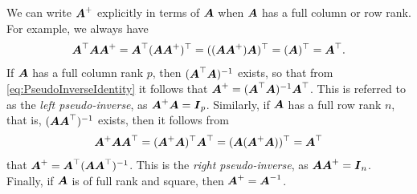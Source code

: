 We can write \(\boldsymbol{A}^+\) explicitly in terms of \(\boldsymbol{A}\) when \(\boldsymbol{A}\) has a full column or row rank. For example, we always have
\begin{equation}
	\boldsymbol{A}^\top \boldsymbol{A} \boldsymbol{A}^+ = \boldsymbol{A}^\top (\boldsymbol{A} \boldsymbol{A}^+)^\top = ((\boldsymbol{A} \boldsymbol{A}^+) \boldsymbol{A})^\top = (\boldsymbol{A})^\top = \boldsymbol{A}^\top. \label{eq:PseudoInverseIdentity}
\end{equation}
If \(\boldsymbol{A}\) has a full column rank \(p\), then \((\boldsymbol{A}^\top \boldsymbol{A})^{-1}\) exists, so that from \eqref{eq:PseudoInverseIdentity} it follows that \(\boldsymbol{A}^+ = (\boldsymbol{A}^\top \boldsymbol{A})^{-1} \boldsymbol{A}^\top\). This is referred to as the \textit{left pseudo-inverse}, as \(\boldsymbol{A}^+ \boldsymbol{A} = \boldsymbol{I}_p\). Similarly, if \(\boldsymbol{A}\) has a full row rank \(n\), that is, \((\boldsymbol{A} \boldsymbol{A}^\top)^{-1}\) exists, then it follows from
\begin{equation*}
	\boldsymbol{A}^+ \boldsymbol{A} \boldsymbol{A}^\top = (\boldsymbol{A}^+ \boldsymbol{A})^\top \boldsymbol{A}^\top = (\boldsymbol{A} (\boldsymbol{A}^+ \boldsymbol{A}))^\top = \boldsymbol{A}^\top
\end{equation*}
that \(\boldsymbol{A}^+ = \boldsymbol{A}^\top (\boldsymbol{A} \boldsymbol{A}^\top)^{-1}\). This is the \textit{right pseudo-inverse}, as \(\boldsymbol{A} \boldsymbol{A}^+ = \boldsymbol{I}_n\). Finally, if \(\boldsymbol{A}\) is of full rank and square, then \(\boldsymbol{A}^+ = \boldsymbol{A}^{-1}\).

